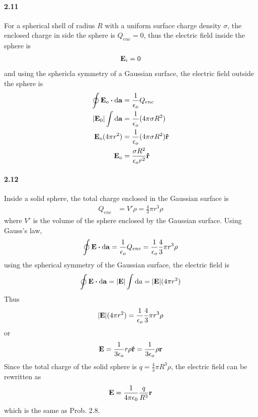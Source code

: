 \documentclass[../main.tex]{subfiles}
\begin{document}
\paragraph{2.11}
For a spherical shell of radius $R$ with a uniform surface charge density $\sigma$, the enclosed
charge in side the sphere is $Q_{enc} = 0$, thus the electric field inside the sphere is 
\begin{align*}
    \vb{E}_i = 0
\end{align*}
and using the sphericla symmetry of a Gaussian surface, the electric field outside the sphere is
\begin{align*}
    \oint \vb{E}_o \vdot \dd{\vb{a}} &= \frac{1}{\epsilon_o} Q_{enc} \\
    \abs{\vb{E}_0} \int \dd{\vb{a}} &= \frac{1}{\epsilon_o} (4\pi\sigma R^2) \\
    \vb{E}_o (4\pi r^2) &= \frac{1}{\epsilon_o} (4\pi\sigma R^2) \vu{r} \\
    \vb{E}_o &= \frac{\sigma R^2}{\epsilon_o r^2} \vu{r}
\end{align*}

\paragraph{2.12}
Inside a solid sphere, the total charge enclosed in the Gaussian surface is
\begin{align*}
    Q_{enc} &=  V'\rho = \frac{4}{3} \pi r^3 \rho
\end{align*}
where $V'$ is the volume of the sphere enclosed by the Gaussian surface. Using Gauss's law,
\begin{align*}
    \oint \vb{E} \vdot \dd{\vb{a}} = \frac{1}{\epsilon_o} Q_{enc}
    = \frac{1}{\epsilon_o} \frac{4}{3} \pi r^3 \rho
\end{align*}
using the spherical symmetry of the Gaussian surface, the electric field is
\begin{align*}
    \oint \vb{E} \vdot \dd{\vb{a}} = \abs{\vb{E}} \int \dd{a} 
    = \abs{\vb{E}} (4\pi r^2)
\end{align*}
Thus
\begin{align*}
    \abs{\vb{E}} (4\pi r^2) = \frac{1}{\epsilon_o} \frac{4}{3} \pi r^3 \rho
\end{align*}
or
\begin{align*}
    \vb{E} = \frac{1}{3\epsilon_o} r \rho \vu{r} = \frac{1}{3\epsilon_o} \rho \vb{r}
\end{align*}
Since the total charge of the solid sphere is $q = \frac{4}{3} \pi R^3 \rho$, the electric field
can be rewritten as
\begin{align*}
    \vb{E} = \frac{1}{4\pi\epsilon_0} \frac{q}{R^3} \vb{r}
\end{align*}
which is the same as Prob. 2.8.
\end{document}

